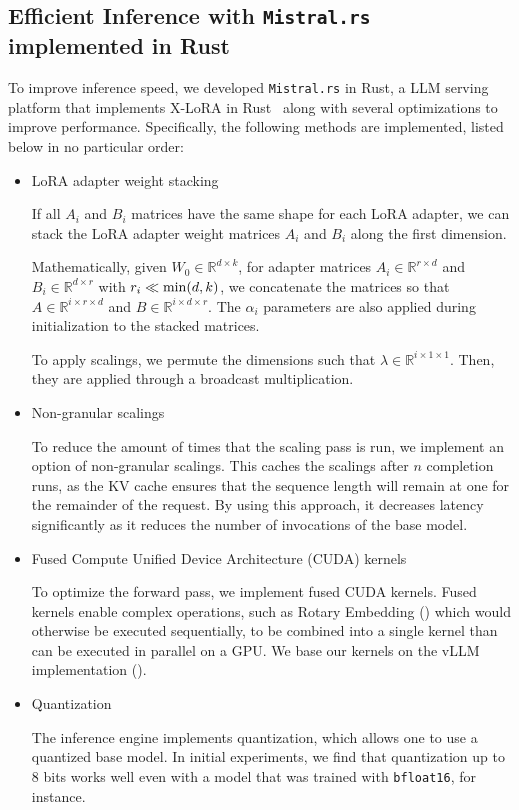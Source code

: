 \subsection{Efficient Inference with \texttt{Mistral.rs} implemented in Rust}
To improve inference speed, we developed \texttt{Mistral.rs} in Rust, a LLM serving platform that implements X-LoRA in Rust~\cite{matsakis2014rust} along with several optimizations to improve performance. Specifically, the following methods are implemented, listed below in no particular order:
\begin{itemize}
    \item LoRA adapter weight stacking
    
        If all $A_i$ and $B_i$ matrices have the same shape for each LoRA adapter, we can stack the LoRA adapter weight matrices $A_i$ and $B_i$ along the first dimension. 
        
        Mathematically, given $W_0 \in \mathbb{R}^{d \times k}$, for adapter matrices $A_i \in \mathbb{R}^{r \times d}$ and $B_i \in \mathbb{R}^{d \times r}$ with $r_i \ll {\rm min} (d,k)$, we concatenate the matrices so that $A\in \mathbb{R}^{i \times r \times d}$ and $B\in \mathbb{R}^{i \times d \times r}$. The $\alpha_i$ parameters are also applied during initialization to the stacked matrices. 

        To apply scalings, we permute the dimensions such that $\lambda \in \mathbb{R} ^ {i \times 1 \times 1}$. Then, they are applied through a broadcast multiplication.
    
    \item Non-granular scalings

        To reduce the amount of times that the scaling pass is run, we implement an option of non-granular scalings. This caches the scalings after $n$ completion runs, as the KV cache ensures that the sequence length will remain at one for the remainder of the request. By using this approach, it decreases latency significantly as it reduces the number of invocations of the base model.
        
    \item Fused Compute Unified Device Architecture (CUDA) kernels

        To optimize the forward pass, we implement fused CUDA kernels. Fused kernels enable complex operations, such as Rotary Embedding (\cite{su2021roformer}) which would otherwise be executed sequentially, to be combined into a single kernel than can be executed in parallel on a GPU. We base our kernels on the vLLM implementation (\cite{kwon2023efficient}).

    \item Quantization

        The inference engine implements quantization, which allows one to use a quantized base model. In initial experiments, we find that quantization up to 8 bits works well even with a model that was trained with \texttt{bfloat16}, for instance.  
    
\end{itemize}

